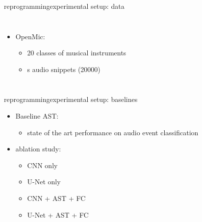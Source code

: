 \begin{frame}{reprogramming}{experimental setup: data}
    \begin{columns}
            \begin{itemize}
                \item   OpenMic:
                    \begin{itemize}
                        \item   20 classes of musical instruments
                        \item   \unit[10]{s} audio snippets (20000)
                    \end{itemize}
            \end{itemize}
    \end{columns}
\end{frame}

\begin{frame}{reprogramming}{experimental setup: baselines}
    \begin{itemize}
        \item Baseline AST:
            \begin{itemize}
                \item   state of the art performance on audio event classification
            \end{itemize}
        \bigskip
        \item   ablation study:
            \begin{itemize}
                \item   CNN only
                \item   U-Net only
                \item   CNN + AST + FC
                \item   U-Net + AST + FC
            \end{itemize}
    \end{itemize}
\end{frame}


